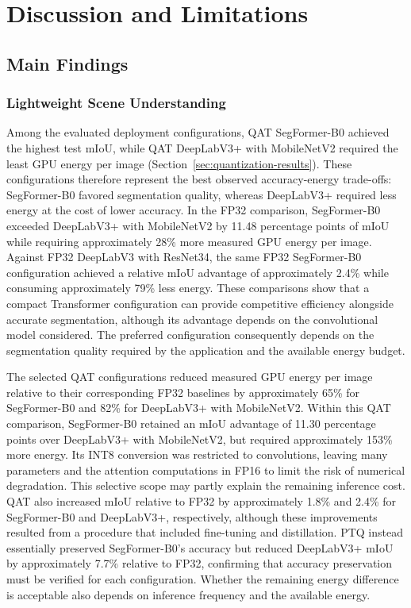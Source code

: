 \chapter{Discussion and Limitations}

\section{Main Findings}

\subsection{Lightweight Scene Understanding}

Among the evaluated deployment configurations, QAT SegFormer-B0 achieved the highest test mIoU, while QAT DeepLabV3+ with MobileNetV2 required the least GPU energy per image (Section~\ref{sec:quantization-results}). These configurations therefore represent the best observed accuracy-energy trade-offs: SegFormer-B0 favored segmentation quality, whereas DeepLabV3+ required less energy at the cost of lower accuracy. In the FP32 comparison, SegFormer-B0 exceeded DeepLabV3+ with MobileNetV2 by 11.48 percentage points of mIoU while requiring approximately 28\% more measured GPU energy per image. Against FP32 DeepLabV3 with ResNet34, the same FP32 SegFormer-B0 configuration achieved a relative mIoU advantage of approximately 2.4\% while consuming approximately 79\% less energy. These comparisons show that a compact Transformer configuration can provide competitive efficiency alongside accurate segmentation, although its advantage depends on the convolutional model considered. The preferred configuration consequently depends on the segmentation quality required by the application and the available energy budget.

The selected QAT configurations reduced measured GPU energy per image relative to their corresponding FP32 baselines by approximately 65\% for SegFormer-B0 and 82\% for DeepLabV3+ with MobileNetV2. Within this QAT comparison, SegFormer-B0 retained an mIoU advantage of 11.30 percentage points over DeepLabV3+ with MobileNetV2, but required approximately 153\% more energy. Its INT8 conversion was restricted to convolutions, leaving many parameters and the attention computations in FP16 to limit the risk of numerical degradation. This selective scope may partly explain the remaining inference cost. QAT also increased mIoU relative to FP32 by approximately 1.8\% and 2.4\% for SegFormer-B0 and DeepLabV3+, respectively, although these improvements resulted from a procedure that included fine-tuning and distillation. PTQ instead essentially preserved SegFormer-B0's accuracy but reduced DeepLabV3+ mIoU by approximately 7.7\% relative to FP32, confirming that accuracy preservation must be verified for each configuration. Whether the remaining energy difference is acceptable also depends on inference frequency and the available energy.

